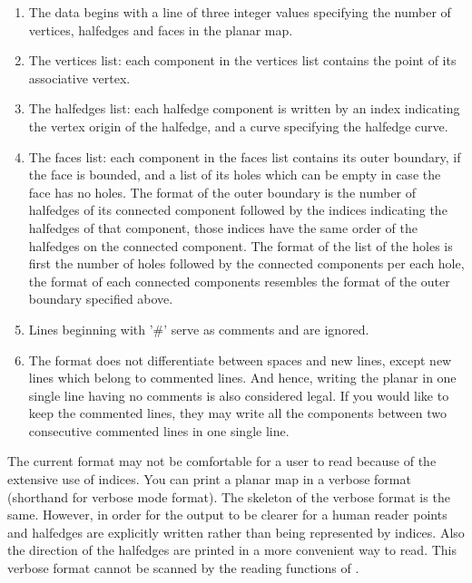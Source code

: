 \begin{ccAdvanced}
\begin{enumerate}
\item The data begins with a line of three integer values specifying
the number of vertices, halfedges and faces in the planar map.
\item The vertices list: each component in the vertices list contains
the point of its associative vertex. 
\item The halfedges list: each halfedge component is written by an
index indicating the vertex origin of the halfedge, and a curve
specifying the halfedge curve.
\item The faces list: each component in the faces list contains its
outer boundary, if the face is bounded, and a list of its holes which
can be empty in case the face has no holes. The format of the outer
boundary is the number of halfedges of its connected component
followed by the indices indicating the halfedges of that component,
those indices have the same order of the halfedges on the connected
component. The format of the list of the holes is first the number of
holes followed by the connected components per each hole, the format
of each connected components resembles the format of the outer
boundary specified above.
\item Lines beginning with '\#' serve as comments and are ignored.
\item The format does not differentiate between spaces and new lines, 
except new lines which belong to commented lines. 
And hence, writing the planar in one single line having no comments is
also considered legal. If you would like to keep the commented
lines, they may write all the components between two consecutive
commented lines in one single line.

\end{enumerate}

The current format may not be comfortable for a user to read because
of the extensive use of indices. You can print a planar map in a
verbose format (shorthand for verbose mode format).  The skeleton of 
the verbose format is the same. However, in order for the output to be
clearer for a human reader points and halfedges are explicitly written
rather than being represented by indices. Also the direction of the
halfedges are printed in a more convenient way to read. This verbose
format cannot be scanned by the reading functions of
.

\ccExample


\end{ccAdvanced}
